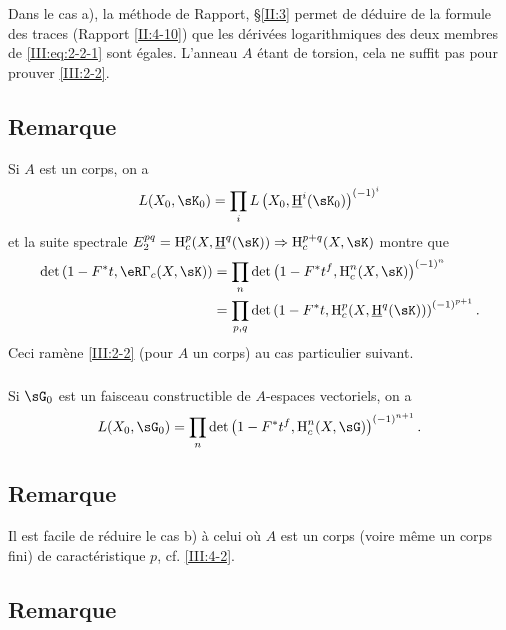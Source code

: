 Dans le cas a), la méthode de Rapport, \S\ref{II:3} permet de déduire de 
la formule des traces (Rapport \ref{II:4-10}) que les dérivées logarithmiques 
des deux membres de \eqref{III:eq:2-2-1} sont égales. L'anneau $A$ étant de 
torsion, cela ne suffit pas pour prouver \ref{III:2-2}. 





\subsection{Remarque}\label{III:2-4}

Si $A$ est un corps, on a 
\[
  L(X_0,\sK_0) = \prod_i L\left(X_0,\underline\h^i(\sK_0)\right)^{(-1)^i}
\]
et la suite spectrale 
$E_2^{p q} = \h_c^p(X,\underline\h^q(\sK))\Rightarrow \h_c^{p+q}(X,\sK)$ montre 
que 
\begin{align*}
  \det\left(1-F^* t, \eR\Gamma_c(X,\sK)\right) 
    &= \prod_n \det\left(1-F^* t^f,\h_c^n(X,\sK)\right)^{(-1)^n} \\
    &= \prod_{p,q} \det\left(1-F^* t,\h_c^p(X,\underline\h^q(\sK))\right)^{(-1)^{p+1}} \text{.}
\end{align*}
Ceci ramène \ref{III:2-2} (pour $A$ un corps) au cas particulier suivant. 


\subsubsection{}\label{III:2-4-1}

Si $\sG_0$ est un faisceau constructible de $A$-espaces vectoriels, on a 
\[
  L(X_0,\sG_0) = \prod_n \det\left(1-F^* t^f,\h_c^n(X,\sG)\right)^{(-1)^{n+1}} \text{.}
\]





\subsection{Remarque}\label{III:2-5}

Il est facile de réduire le cas b) à celui où $A$ est un corps (voire 
même un corps fini) de caractéristique $p$, cf. \ref{III:4-2}. 





\subsection{Remarque}\label{III:2-6}

